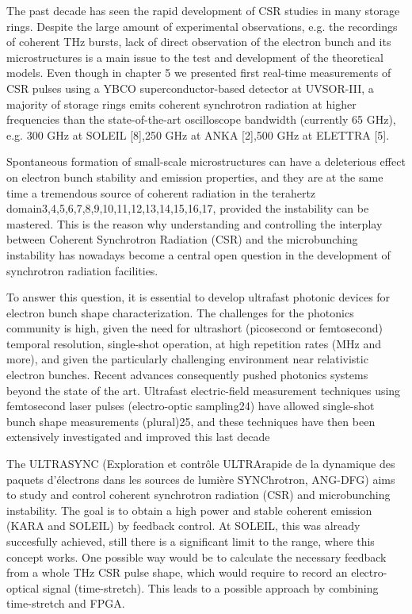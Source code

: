 The past decade has seen the rapid development of CSR studies in many storage
rings. Despite the large amount of experimental observations, e.g. the recordings
of coherent THz bursts, lack of direct observation of the electron bunch and its
microstructures is a main issue to the test and development of the theoretical models.
Even though in chapter 5 we presented first real-time measurements of CSR
pulses using a YBCO superconductor-based detector at UVSOR-III, a majority
of storage rings emits coherent synchrotron radiation at higher frequencies than
the state-of-the-art oscilloscope bandwidth (currently 65 GHz), e.g. 300 GHz
at SOLEIL [8],250 GHz at ANKA [2],500 GHz at ELETTRA [5].

Spontaneous formation of small-scale microstructures can have a deleterious effect on electron bunch stability and emission properties, and they are at the same time a tremendous source of coherent radiation in the terahertz domain3,4,5,6,7,8,9,10,11,12,13,14,15,16,17, provided the instability can be mastered. This is the reason why understanding and controlling the interplay between Coherent Synchrotron Radiation (CSR) and the microbunching instability has nowadays become a central open question in the development of synchrotron radiation facilities.

To answer this question, it is essential to develop ultrafast photonic devices for electron bunch shape characterization. The challenges for the photonics community is high, given the need for ultrashort (picosecond or femtosecond) temporal resolution, single-shot operation, at high repetition rates (MHz and more), and given the particularly challenging environment near relativistic electron bunches. Recent advances consequently pushed photonics systems beyond the state of the art. Ultrafast electric-field measurement techniques using femtosecond laser pulses (electro-optic sampling24) have allowed single-shot bunch shape measurements (plural)25, and these techniques have then been extensively investigated and improved this last decade


The ULTRASYNC (Exploration et contrôle ULTRArapide de la dynamique des paquets d'électrons dans les sources de lumière SYNChrotron, ANG-DFG) aims to study and control coherent synchrotron radiation (CSR) and microbunching instability. The goal is to obtain a high power and stable coherent emission (KARA and SOLEIL) by feedback control. At SOLEIL, this was already succesfully achieved, still there is a significant limit to the range, where this concept works. One possible way would be to calculate the necessary feedback from a whole THz CSR pulse shape, which would require to record an electro-optical signal (time-stretch). This leads to a possible approach by combining time-stretch and FPGA. 

